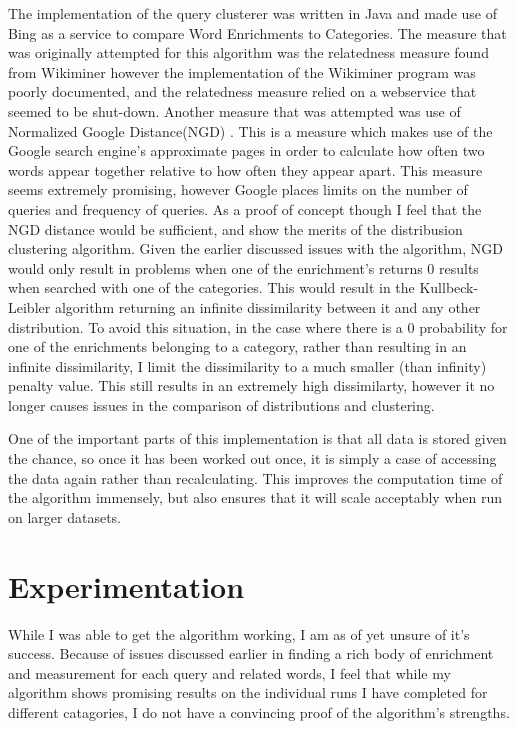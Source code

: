 \documentclass[letterpaper]{article}
\begin{document}
The implementation of the query clusterer was written in Java and made use of Bing as a service to compare Word Enrichments to Categories. 
The measure that was originally attempted for this algorithm was the relatedness measure found from Wikiminer \cite{wikiminer} however the implementation of the Wikiminer program was poorly documented, and the relatedness measure relied on a webservice that seemed to be shut-down. Another measure that was attempted was use of Normalized Google Distance(NGD) \cite{NGD}. This is a measure which makes use of the 
Google search engine's approximate pages in order to calculate how often two words appear together relative to how often they appear apart. This measure seems extremely promising, however
Google places limits on the number of queries and frequency of queries. As a proof of concept though I feel that the NGD distance would be sufficient, and show the merits of the distribusion clustering algorithm. Given the earlier discussed issues with the algorithm, NGD would only result in problems when one of the enrichment's returns 0 results when searched with one of the categories. This would result in the Kullbeck-Leibler algorithm returning an infinite dissimilarity between it and any other distribution. To avoid this situation, in the case where there is a 0 probability for one of the enrichments belonging to a category, rather than resulting in an infinite dissimilarity, I limit the dissimilarity to a much smaller (than infinity) penalty value. This still results in an extremely high dissimilarty, however it no longer causes issues in the comparison of distributions and clustering.

One of the important parts of this implementation is that all data is stored given the chance, so once it has been worked out once, it is simply a case of accessing the data again rather than recalculating.
This improves the computation time of the algorithm immensely, but also ensures that it will scale acceptably when run on larger datasets.



\section{Experimentation}

While I was able to get the algorithm working, I am as of yet unsure of it's success.
Because of issues discussed earlier in finding a rich body of enrichment and measurement for each query and related words, I feel that while my algorithm shows promising results
on the individual runs I have completed for different catagories, I do not have a convincing proof of the algorithm's strengths.
\end{document}
